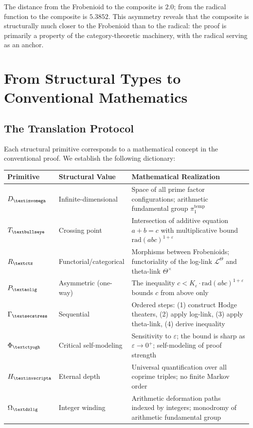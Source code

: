 \documentclass[12pt]{article}
\newcommand{\invomega}{\text{\textinvomega}}
\newcommand{\aolig}{\text{\textaolig}}
\newcommand{\secstress}{\text{\textsecstress}}
\newcommand{\igbullseye}{\text{\textbullseye}}
\newcommand{\ctyogh}{\text{\textctyogh}}
\newcommand{\invscripta}{\text{\textinvscripta}}
\newcommand{\ctz}{\text{\textctz}}
\newcommand{\dzlig}{\text{\textdzlig}}
\begin{document}
The distance from the Frobenioid to the composite is $2.0$; from the radical function to the composite is $5.3852$. This asymmetry reveals that the composite is structurally much closer to the Frobenioid than to the radical: the proof is primarily a property of the category-theoretic machinery, with the radical serving as an anchor.

\section{From Structural Types to Conventional Mathematics}

\subsection{The Translation Protocol}

Each structural primitive corresponds to a mathematical concept in the conventional proof. We establish the following dictionary:

\begin{table}[h]
\centering
\begin{tabular}{p{2.5cm} p{5cm} p{5cm}}
\hline
\textbf{Primitive} & \textbf{Structural Value} & \textbf{Mathematical Realization} \\
\hline
$D_{\invomega}$ & Infinite-dimensional & Space of all prime factor configurations; arithmetic fundamental group $\pi_1^{\text{temp}}$ \\
$T_{\igbullseye}$ & Crossing point & Intersection of additive equation $a+b=c$ with multiplicative bound $\text{rad}(abc)^{1+\varepsilon}$ \\
$R_{\ctz}$ & Functorial/categorical & Morphisms between Frobenioids; functoriality of the log-link $\mathcal{L}^\Theta$ and theta-link $\Theta^\times$ \\
$P_{\aolig}$ & Asymmetric (one-way) & The inequality $c < K_\varepsilon \cdot \text{rad}(abc)^{1+\varepsilon}$ bounds $c$ from above only \\
$\Gamma_{\secstress}$ & Sequential & Ordered steps: (1) construct Hodge theaters, (2) apply log-link, (3) apply theta-link, (4) derive inequality \\
$\Phi_{\ctyogh}$ & Critical self-modeling & Sensitivity to $\varepsilon$; the bound is sharp as $\varepsilon \to 0^+$; self-modeling of proof strength \\
$H_{\invscripta}$ & Eternal depth & Universal quantification over all coprime triples; no finite Markov order \\
$\Omega_{\dzlig}$ & Integer winding & Arithmetic deformation paths indexed by integers; monodromy of arithmetic fundamental group \\
\hline
\end{tabular}
\end{table}
\end{document}
